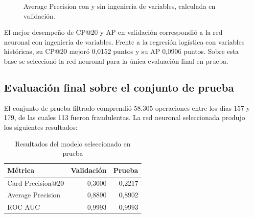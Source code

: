 
\begin{figure}[!htbp]
    \centering
    \resizebox{1\textwidth}{!}{}
    \caption{Average Precision con y sin ingeniería de variables, calculada en validación.}
    \label{fig:ap}
\end{figure}


El mejor desempeño de CP@20 y AP en validación correspondió a la red neuronal con ingeniería de variables. Frente a la regresión logística con variables históricas, su CP@20 mejoró 0,0152 puntos y su AP 0,0906 puntos. Sobre esta base se seleccionó la red neuronal para la única evaluación final en prueba.

\subsection{Evaluación final sobre el conjunto de prueba}
El conjunto de prueba filtrado comprendió 58.305 operaciones entre los días 157 y 179, de las cuales 113 fueron fraudulentas. La red neuronal seleccionada produjo los siguientes resultados:

\begin{table}[!htbp]
\centering
\caption{Resultados del modelo seleccionado en prueba}
\label{tab:test}
\begin{tabular}{@{}lrr@{}}
\toprule
\textbf{Métrica} & \textbf{Validación} & \textbf{Prueba} \\
\midrule
Card Precision@20 & 0,3000 & 0,2217 \\
Average Precision & 0,8890 & 0,8902 \\
ROC-AUC & 0,9993 & 0,9993 \\
\bottomrule
\end{tabular}
\par\smallskip
\end{table}

